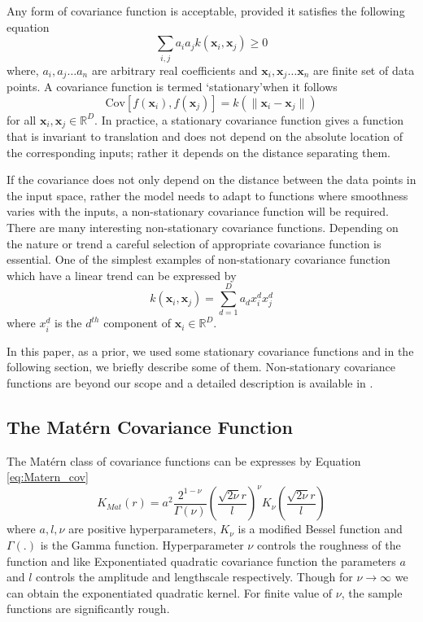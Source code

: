 Any form of covariance function is acceptable, provided it satisfies the following equation
\begin{equation} \label{eq:cov_basic}
\sum_{i,j} a_i a_j k\left(\textbf{x}_i,\textbf{x}_j\right)\geq 0
\end{equation}
where, $a_i, a_j \dots a_n$ are arbitrary real coefficients and $\textbf{x}_i, \textbf{x}_j \dots \textbf{x}_n$ are finite set of data points. A covariance function is termed \lq stationary\rq when it follows
\begin{equation} \label{eq:cov_stationary}
\text{Cov}\left[f\left(\textbf{x}_i\right),f\left(\textbf{x}_j\right)\right] = k\left( \lVert \textbf{x}_i -\textbf{x}_j \rVert \right)
\end{equation}
for all $\textbf{x}_i,\textbf{x}_j \in \mathbb{R}^D$. In practice, a stationary covariance function gives a function that is invariant to translation and does not depend on the absolute location of the corresponding inputs; rather it depends on the distance separating them. 

If the covariance does not only depend on the distance between the data points in the input space, rather the model needs to adapt to functions where smoothness varies with the inputs, a non-stationary covariance function will be required. There are many interesting non-stationary covariance functions. Depending on the nature or trend a careful selection of appropriate covariance function is essential. One of the simplest examples of non-stationary covariance function which have a linear trend can be expressed by 
\begin{equation} \label{eq:cov_nonStationary}
k\left( \textbf{x}_i, \textbf{x}_j \right) = \sum_{d=1}^{D} a_d x_i^d x_j^d
\end{equation}
where $x_i^d$ is the $d^{th}$ component of $\textbf{x}_i \in \mathbb{R}^D$. 

In this paper, as a prior, we used some stationary covariance functions and in the following section, we briefly describe some of them. Non-stationary covariance functions are beyond our scope and a detailed description is available in \cite{Rasmussen_and_Williams:2006}.

\subsection{The Mat{\'e}rn Covariance Function}
The Mat{\'e}rn class of covariance functions can be expresses by Equation \ref{eq:Matern_cov}
\begin{equation} \label{eq:Matern_cov}
K_{Mat}(r)= a^2\frac{2^{1-\nu}}{\Gamma(\nu)}\left(\frac{\sqrt{2\nu}r}{l}\right)^\nu K_{\nu}
\left(\frac{\sqrt{2\nu}r}{l}\right)
\end{equation}
where $a, l, \nu$ are positive hyperparameters, $K_{\nu}$ is a modified Bessel function and $\Gamma \left(.\right)$ is the Gamma function. Hyperparameter $\nu$ controls the roughness of the function and like Exponentiated quadratic covariance function the parameters $a$ and $l$ controls the amplitude and lengthscale respectively. Though for $\nu \to \infty$ we can obtain the exponentiated quadratic kernel. For finite value of $\nu$, the sample functions are significantly rough. 

